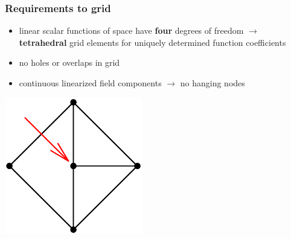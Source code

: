 \documentclass{beamer}
\begin{document}
\begin{frame}
\frametitle{Requirements to grid}
\vspace{-0.5cm}
\begin{itemize}
	\item linear scalar functions of space have \textbf{four} degrees of freedom $\rightarrow$ \textbf{tetrahedral} grid elements for uniquely determined function coefficients
	
	\item no holes or overlaps in grid
		
	\item continuous linearized field components \newline $\rightarrow$ no hanging nodes
	
\end{itemize}
\vspace{-0.6cm} \hspace{0.9cm}\includegraphics[trim={4 1.6 1 0.6cm},clip,width=0.45\textwidth,right]{FIGURES/HangingNode.eps}
\end{frame}

%
\end{document}
